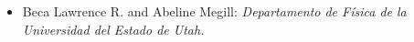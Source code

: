 \documentclass[letterpaper,10pt]{article}
\begin{document}
\begin{itemize}[label=$\blacktriangleright$]

\item Beca Lawrence  R. and Abeline Megill: \emph{Departamento de F\'isica de la Universidad del Estado de Utah.}   %
  \end{itemize}




\begin{comment}

\hangindent=0.4cm  

$\blacktriangleright$ Bucy Scholarship in Applied Physics: \emph{TTU Physics \& Astronomy Department. Fall 2020} \\  %
  $\blacktriangleright$  Erasmus Mundus Scholarship: 2-year scholarship awarded by the European Commission  \\    
 \hspace{.2 cm}    $\blacktriangleright$  Presidential Scholarship: Full 4-year scholarship awarded by the Dominican Government \\    
\hspace{.2 cm}   $\blacktriangleright$  Member: \emph{Sigma Pi Sigma}, The Physics Honor Society  \\   
\hspace{.2 cm}   $\blacktriangleright$   Lawrence  R. and Abeline Megill Scholarship: \emph{USU Physics Department}   %
\end{comment}



\end{document}
